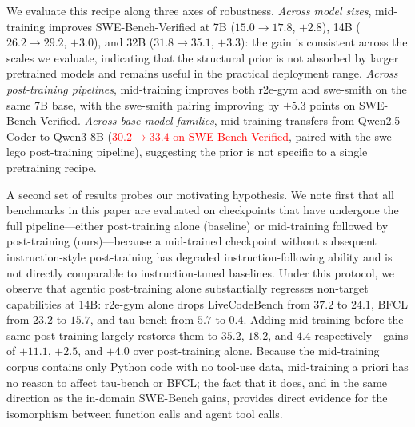 We evaluate this recipe along three axes of robustness. \emph{Across model
sizes}, mid-training improves SWE-Bench-Verified at 7B
($15.0 \to 17.8$, $+2.8$), 14B ($26.2 \to 29.2$, $+3.0$), and 32B
($31.8 \to 35.1$, $+3.3$): the gain is consistent across the scales we
evaluate, indicating that the structural prior is not absorbed by larger
pretrained models and remains useful in the practical deployment range.
\emph{Across post-training pipelines}, mid-training improves both r2e-gym
and swe-smith on the same 7B base, with the swe-smith pairing improving by
$+5.3$ points on SWE-Bench-Verified. \emph{Across base-model families},
mid-training transfers from Qwen2.5-Coder to Qwen3-8B
(\textcolor{red}{$30.2 \to 33.4$ on SWE-Bench-Verified}, paired with the
swe-lego post-training pipeline), suggesting the prior is not specific to
a single pretraining recipe.

A second set of results probes our motivating hypothesis. We note first
that all benchmarks in this paper are evaluated on checkpoints that have
undergone the full pipeline---either post-training alone (baseline) or
mid-training followed by post-training (ours)---because a mid-trained
checkpoint without subsequent instruction-style post-training has degraded
instruction-following ability and is not directly comparable to
instruction-tuned baselines. Under this protocol, we observe that agentic
post-training alone substantially regresses non-target capabilities at
14B: r2e-gym alone drops LiveCodeBench from $37.2$ to $24.1$, BFCL from
$23.2$ to $15.7$, and tau-bench from $5.7$ to $0.4$. Adding mid-training
before the same post-training largely restores them to $35.2$, $18.2$, and
$4.4$ respectively---gains of $+11.1$, $+2.5$, and $+4.0$ over post-training
alone. Because the mid-training corpus contains only Python code with no
tool-use data, mid-training a priori has no reason to affect tau-bench or
BFCL; the fact that it does, and in the same direction as the in-domain
SWE-Bench gains, provides direct evidence for the isomorphism between
function calls and agent tool calls.

